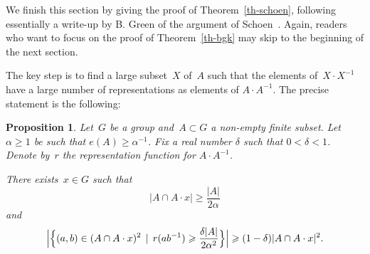 \documentclass[12pt]{amsart}
\renewcommand{\geq}{\geqslant}
\numberwithin{equation}{section}
\theoremstyle{plain}
\newtheorem{proposition}[theorem]{Proposition}
\theoremstyle{remark}
\theoremstyle{definition}
\renewcommand{\geq}{\geqslant}
\begin{document}
We finish this section by giving the proof of Theorem~\ref{th-schoen},
following essentially a write-up by B. Green of the argument of
Schoen~\cite{schoen}.  Again, readers who want to focus on the proof of
Theorem~\ref{th-bgk} may skip to the beginning of the next section.

The key step is to find a large subset~$X$ of~$A$ such that the elements
of~$X\cdot X^{-1}$ have a large number of representations as elements of
$A\cdot A^{-1}$. The precise statement is the following:

\begin{proposition}\label{pr-interm}
  Let~$G$ be a group and~$A\subset G$ a non-empty finite
  subset. Let~$\alpha\geq 1$ be such that $e(A)\geq \alpha^{-1}$. Fix a
  real number $\delta$ such that $0<\delta<1$.  Denote by~$r$ the
  representation function for $A\cdot A^{-1}$.

  There exists~$x\in G$ such that
  \begin{equation}\label{eq-schoen-1}
    |A\cap A\cdot x|\geq\frac{|A|}{2\alpha}
  \end{equation}
  and
  \begin{equation}\label{eq-schoen-2}
    \Bigl|\Bigl\{(a,b)\in (A\cap A\cdot x)^2\,\mid\, r(ab^{-1})\geq
    \frac{\delta|A|}{2\alpha^2} \Bigr\}
    \Bigr|\geq (1-\delta)|A\cap A\cdot x|^2.
  \end{equation}
\end{proposition}
\end{document}
